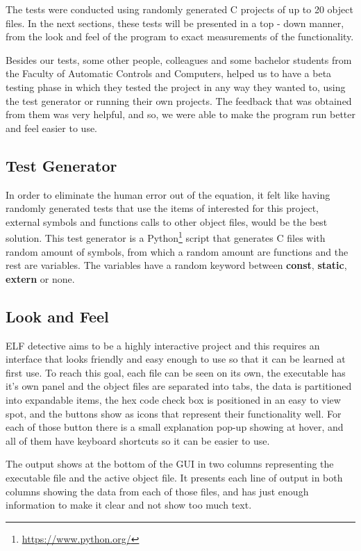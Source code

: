 The tests were conducted using randomly generated C projects of up to 20 object files. In the next sections, these tests will be presented in a top -{} down manner, from the look and feel of the program to exact measurements of the functionality.

Besides our tests, some other people, colleagues and some bachelor students from the Faculty of Automatic Controls and Computers, helped us to have a beta testing phase in which they tested the project in any way they wanted to, using the test generator or running their own projects. The feedback that was obtained from them was very helpful, and so, we were able to make the program run better and feel easier to use.

\subsection{Test Generator}
\label{sec:test-gen}

In order to eliminate the human error out of the equation, it felt like having randomly generated tests that use the items of interested for this project, external symbols and functions calls to other object files, would be the best solution. This test generator is a Python\footnote{\url{https://www.python.org/}} script that generates C files with random amount of symbols, from which a random amount are functions and the rest are variables. The variables have a random keyword between \textbf{const}, \textbf{static}, \textbf{extern} or none.

\subsection{Look and Feel}
\label{sec:look-feel}

ELF detective aims to be a highly interactive project and this requires an interface that looks friendly and easy enough to use so that it can be learned at first use. To reach this goal, each file can be seen on its own, the executable has it's own panel and the object files are separated into tabs, the data is partitioned into expandable items, the hex code check box is positioned in an easy to view spot, and the buttons show as icons that represent their functionality well. For each of those button there is a small explanation pop-{}up showing at hover, and all of them have keyboard shortcuts so it can be easier to use. 

The output shows at the bottom of the GUI in two columns representing the executable file and the active object file. It presents each line of output in both columns showing the data from each of those files, and has just enough information to make it clear and not show too much text.



